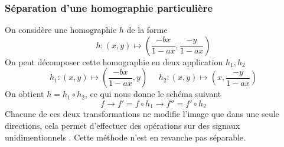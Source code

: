
\subsubsection{Séparation d'une homographie particulière }

On considère une homographie $h$ de la forme 
\begin{equation*}
h:(x,y)\mapsto \left(\frac{-bx}{1-ax},\frac{-y}{1-ax}\right)
\end{equation*}
On peut décomposer cette homographie en deux application $h_1 , h_2$
\begin{equation*}
h_1:(x,y) \mapsto \left(\frac{-bx}{1-ax}    ,y\right)~~~~~~h_2:(x,y) \mapsto \left(x,\frac{-y}{1-ax}\right)
\end{equation*}
On obtient $h=h_1  \circ h_2$, ce qui nous donne le schéma suivant 
\begin{equation*}
f\longrightarrow f'=f\circ h_1 \longrightarrow f''=f'\circ h_2
\end{equation*}
Chacune de ces deux transformations ne modifie l'image que dans une seule directions, cela permet d'effectuer des opérations sur des signaux unidimentionnels . Cette méthode n'est en revanche pas séparable.\\
